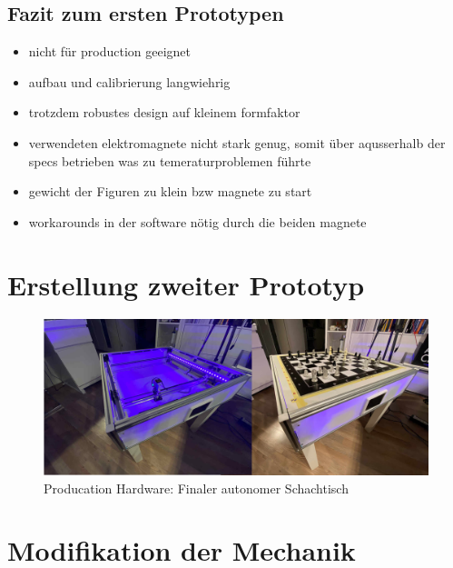 \hypertarget{fazit-zum-ersten-prototypen}{%
\subsection{Fazit zum ersten
Prototypen}\label{fazit-zum-ersten-prototypen}}

\begin{itemize}
\tightlist
\item
  nicht für production geeignet
\item
  aufbau und calibrierung langwiehrig
\item
  trotzdem robustes design auf kleinem formfaktor
\item
  verwendeten elektromagnete nicht stark genug, somit über aqusserhalb
  der specs betrieben was zu temeraturproblemen führte
\item
  gewicht der Figuren zu klein bzw magnete zu start
\item
  workarounds in der software nötig durch die beiden magnete
\end{itemize}

\hypertarget{erstellung-zweiter-prototyp}{%
\section{Erstellung zweiter
Prototyp}\label{erstellung-zweiter-prototyp}}

\begin{figure}
\centering
\includegraphics{images/table_images/prod.png}
\caption{Producation Hardware: Finaler autonomer Schachtisch}
\end{figure}

\hypertarget{modifikation-der-mechanik}{%
\section{Modifikation der Mechanik}\label{modifikation-der-mechanik}}

